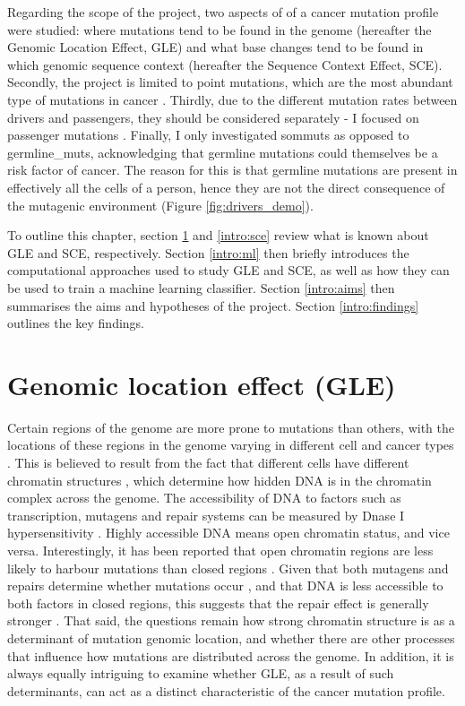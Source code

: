 Regarding the scope of the project, two aspects of of a cancer mutation profile were studied: where mutations tend to be found in the genome (hereafter the Genomic Location Effect, GLE) and what \gls{base} changes tend to be found in which genomic sequence context (hereafter the Sequence Context Effect, SCE). Secondly, the project is limited to point mutations, which are the most abundant type of mutations in cancer \citep{Alexandrov2020}. Thirdly, due to the different mutation rates between drivers and passengers, they should be considered separately - I focused on passenger mutations \citep{McFarland2014Tug-of-warProcesses}. Finally, I only investigated \glspl{sommut} as opposed to \glspl{germline_mut}, acknowledging that germline mutations could themselves be a risk factor of cancer. The reason for this is that germline mutations are present in effectively all the cells of a person, hence they are not the direct consequence of the mutagenic environment (Figure \ref{fig:drivers_demo}). 

To outline this chapter, section \ref{intro:gle} and \ref{intro:sce} review what is known about GLE and SCE, respectively. Section \ref{intro:ml} then briefly introduces the computational approaches used to study GLE and SCE, as well as how they can be used to train a machine learning classifier. Section \ref{intro:aims} then summarises the aims and hypotheses of the project. Section \ref{intro:findings} outlines the key findings.

\section{Genomic location effect (GLE)}
\label{intro:gle}
Certain regions of the genome are more prone to mutations than others, with the locations of these regions in the genome varying in different cell and cancer types \citep{Polak2015, Jiao2020}. This is believed to result from the fact that different cells have different chromatin structures \citep{Abascal2020ExpandedGenomes}, which determine how hidden DNA is in the chromatin complex across the genome. The accessibility of DNA to factors such as transcription, mutagens and repair systems can be measured by Dnase I hypersensitivity \citep[DHS;][]{Liu2019AApplications}. Highly accessible DNA means open chromatin status, and vice versa. Interestingly, it has been reported that open chromatin regions are less likely to harbour mutations than closed regions \citep{Polak2015,Prendergast2007ChromatinGenome}. Given that both \glspl{mutagen} and repairs determine whether mutations occur \citep{Ripley2001Mutation}, and that DNA is less accessible to both factors in closed regions, this suggests that the repair effect is generally stronger \citep[Figure \ref{fig:chromatin_demo};][]{Teng1997ExcisionSequences, Morse2002PhotoreactivationCerevisiae}. That said, the questions remain how strong chromatin structure is as a determinant of mutation genomic location, and whether there are other processes that influence how mutations are distributed across the genome. In addition, it is always equally intriguing to examine whether GLE, as a result of such determinants, can act as a distinct characteristic of the cancer mutation profile. 

